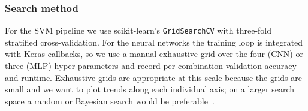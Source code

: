 \documentclass[../main.tex]{subfiles}
\begin{document}
\subsubsection{Search method}
\noindent
For the \gls{SVM} pipeline we use scikit-learn's \texttt{GridSearchCV}
with three-fold stratified cross-validation. For the neural networks the
training loop is integrated with Keras callbacks, so we use a manual
exhaustive grid over the four (\gls{CNN}) or three (\gls{MLP}) hyper-parameters
and record per-combination validation accuracy and runtime. Exhaustive
grids are appropriate at this scale because the grids are small and we want
to plot trends along each individual axis; on a larger search space a
random or Bayesian search would be preferable~\cite{bergstra2012random}.
\end{document}
